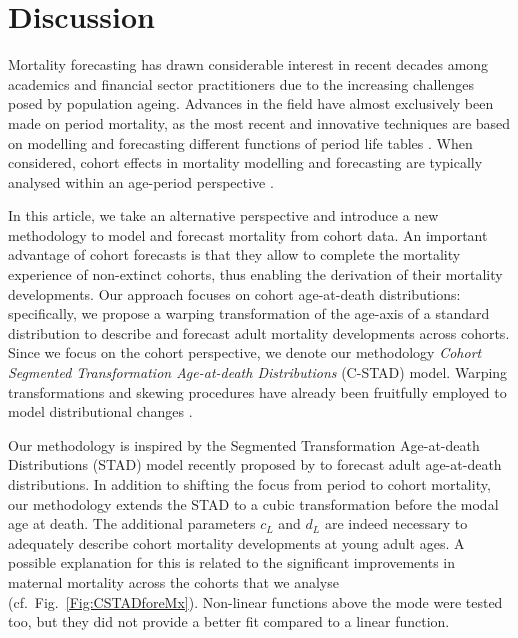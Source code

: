 \documentclass[11pt, a4paper]{article}
\begin{document}
\section{Discussion} 
\label{Sec:Discussion}
Mortality forecasting has drawn considerable interest in recent decades among academics and financial sector practitioners due to the increasing challenges posed by population ageing. Advances in the field have almost exclusively been made on period mortality, as the most recent and innovative techniques are based on modelling and forecasting different functions of period life tables \cite[see, for example,][]{lee1992modeling,cairns2006two,raftery2013bayesian}. When considered, cohort effects in mortality modelling and forecasting are typically analysed within an age-period perspective \citep{renshaw2006cohort,cairns2009quantitative,plat2009stochastic,dokumentov2018bivariate}.  
 
In this article, we take an alternative perspective and introduce a new methodology to model and forecast mortality from cohort data. An important advantage of cohort forecasts is that they allow to complete the mortality experience of non-extinct cohorts, thus enabling the derivation of their mortality developments. Our approach focuses on cohort age-at-death distributions: specifically, we propose a warping transformation of the age-axis of a standard distribution to describe and forecast adult mortality developments across cohorts. Since we focus on the cohort perspective, we denote our methodology \emph{Cohort Segmented Transformation Age-at-death Distributions} (C-STAD) model. Warping transformations and skewing procedures have already been fruitfully employed to model distributional changes \cite[see, e.g.,][]{fernandez1998bayesian,camarda2008warped}. 

Our methodology is inspired by the Segmented Transformation Age-at-death Distributions (STAD) model recently proposed by \cite{basellini2019modelling} to forecast adult age-at-death distributions. In addition to shifting the focus from period to cohort mortality, our methodology extends the STAD to a cubic transformation before the modal age at death. The additional parameters $c_L$ and $d_L$ are indeed necessary to adequately describe cohort mortality developments at young adult ages. A possible explanation for this is related to the significant improvements in maternal mortality across the cohorts that we analyse (cf.~Fig.~\ref{Fig:CSTADforeMx}). Non-linear functions above the mode were tested too, but they did not provide a better fit compared to a linear function. 
\end{document}
